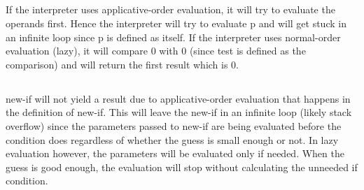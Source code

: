 \documentclass{article}
\begin{document}
\subsection{}
If the interpreter uses applicative-order evaluation, it will try to evaluate the operands first. Hence the interpreter will try to evaluate p and will get stuck in an infinite loop since p is defined as itself.
If the interpreter uses normal-order evaluation (lazy), it will compare 0 with 0 (since test is defined as the comparison) and will return the first result which is 0.

\subsection{}
new-if will not yield a result due to applicative-order evaluation that happens in the definition of new-if. This will leave the new-if in an infinite loop (likely stack overflow) since the parameters passed to new-if are being evaluated before the condition does regardless of whether the guess is small enough or not. In lazy evaluation however, the parameters will be evaluated only if needed. When the guess is good enough, the evaluation will stop without calculating the unneeded if condition.
\end{document}
